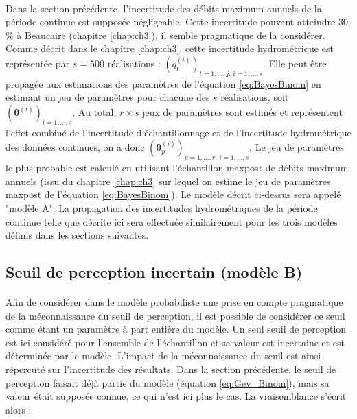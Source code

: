 	\paragraph{} Dans la section précédente, l'incertitude des débits maximum annuels de la période continue est supposée négligeable. Cette incertitude pouvant atteindre 30 \% à Beaucaire (chapitre \ref{chap:ch3}), il semble pragmatique de la considérer. Comme décrit dans le chapitre \ref{chap:ch3}, cette incertitude hydrométrique est représentée par $s = 500$ réalisations : $(q_t^{(i)})_{t=1,...,j;\,i=1,...,s}$. Elle peut être propagée aux estimations des paramètres de l'équation \ref{eq:BayesBinom} en estimant un jeu de paramètres pour chacune des $s$ réalisations, soit $(\boldsymbol{\theta}
	^{(i)})_{i=1,...,s}$. Au total, $r \times s$ jeux de paramètres sont estimés et représentent l'effet combiné de l'incertitude d'échantillonnage et de l'incertitude hydrométrique des données continues, on a donc $(\boldsymbol{\theta}^{(i)}_p)_{p=1,...,r;\, i=1,...,s}$. Le jeu de paramètres le plus probable est calculé en utilisant l'échantillon maxpost de débits maximum annuels (issu du chapitre \ref{chap:ch3} sur lequel on estime le jeu de paramètres maxpost de l'équation \ref{eq:BayesBinom}). Le modèle décrit ci-dessus sera appelé "modèle A". La propagation des incertitudes hydrométriques de la période continue telle que décrite ici sera effectuée similairement pour les trois modèles définis dans les sections suivantes.
	
	\subsection{Seuil de perception incertain (modèle B)}
	\label{subsec:modB}
	
		\paragraph{}
		Afin de considérer dans le modèle probabiliste une prise en compte pragmatique de la méconnaissance du seuil de perception, il est possible de considérer ce seuil comme étant un paramètre à part entière du modèle. Un seul seuil de perception est ici considéré pour l'ensemble de l'échantillon et sa valeur est incertaine et est déterminée par le modèle. L'impact de la méconnaissance du seuil est ainsi répercuté sur l'incertitude des résultats. Dans la section précédente, le seuil de perception faisait déjà partie du modèle (équation \ref{eq:Gev_Binom}), mais sa valeur était supposée connue, ce qui n'est ici plus le cas. La vraisemblance s'écrit alors : 
		
